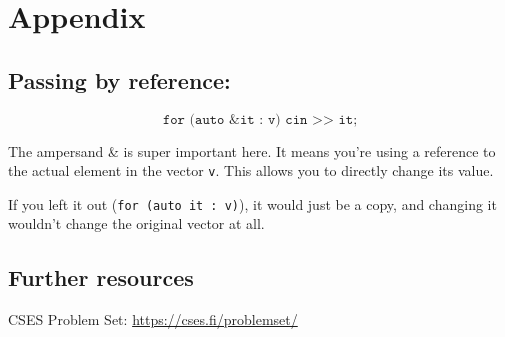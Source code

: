 \chapter{Appendix}

\section*{Passing by reference:}
\[
\texttt{for (auto \&it : v) cin >> it;}
\]

The ampersand \& is super important here. It means you're using a reference to the actual element in the vector \texttt{v}.  
This allows you to directly change its value.  

If you left it out (\texttt{for (auto it : v)}), it would just be a copy, and changing it wouldn't change the original vector at all.

\section*{Further resources}
CSES Problem Set: \url{https://cses.fi/problemset/}
